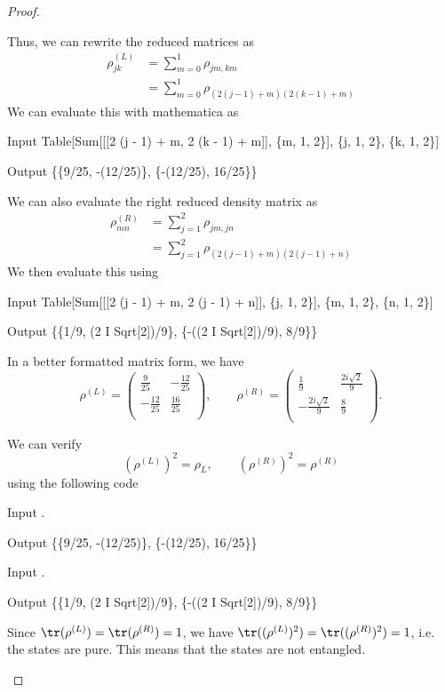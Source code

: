 \begin{proof}
\begin{parts}
		Thus, we can rewrite the reduced matrices as
		\begin{align*}
			\rho_{jk}^{(L)} &= \sum_{m=0}^1 \rho_{jm,km}\\
			&= \sum_{m=0}^1 \rho_{(2(j-1)+m)(2(k-1)+m)}
		\end{align*}
		We can evaluate this with mathematica as
		\begin{mmaCell}{Input}
Table[Sum[\mmaUnd{\(\rho\)}[[2 (j - 1) + m, 2 (k - 1) + m]], \{m, 1, 2\}], \{j, 1, 2\}, \{k, 1, 2\}]
		\end{mmaCell}
		\begin{mmaCell}{Output}
\{\{9/25, -(12/25)\}, \{-(12/25), 16/25\}\}
		\end{mmaCell}
		We can also evaluate the right reduced density matrix as
		\begin{align*}
			\rho_{mn}^{(R)} &= \sum_{j=1}^2 \rho_{jm,jn} \\
					&= \sum_{j=1}^2 \rho_{(2(j-1)+m)(2(j-1)+n)} 
		\end{align*}
		We then evaluate this using
		\begin{mmaCell}{Input}
Table[Sum[\mmaUnd{\(\rho\)}[[2 (j - 1) + m, 2 (j - 1) + n]], \{j, 1, 2\}], \{m, 1, 2\}, \{n, 1, 2\}]
		\end{mmaCell}
		\begin{mmaCell}{Output}
\{\{1/9, (2 I Sqrt[2])/9\}, \{-((2 I Sqrt[2])/9), 8/9\}\}
		\end{mmaCell}
		In a better formatted matrix form, we have
		\[
			\rho^{(L)} =\left(
\begin{array}{cc}
 \frac{9}{25} & -\frac{12}{25} \\
 -\frac{12}{25} & \frac{16}{25} \\
\end{array}
\right), \qquad \rho^{(R)} =\left(
\begin{array}{cc}
 \frac{1}{9} & \frac{2 i \sqrt{2}}{9} \\
 -\frac{2 i \sqrt{2}}{9} & \frac{8}{9} \\
\end{array}
\right)  
		.\] 
	\item We can verify
		\[
			(\rho^{(L)})^2 = \rho_L,\qquad (\rho^{(R)})^2 = \rho^{(R)}
		\]
		using the following code
		\begin{mmaCell}{Input}
.
		\end{mmaCell}
		\begin{mmaCell}{Output}
\{\{9/25, -(12/25)\}, \{-(12/25), 16/25\}\}
		\end{mmaCell}
		\begin{mmaCell}{Input}
.
		\end{mmaCell}
		\begin{mmaCell}{Output}
\{\{1/9, (2 I Sqrt[2])/9\}, \{-((2 I Sqrt[2])/9), 8/9\}\}
		\end{mmaCell}
		Since $\tr(\rho^{(L)})=\tr(\rho^{(R)})=1$, we have $\tr((\rho^{(L)})^2)=\tr((\rho^{(R)})^2)=1$, i.e. the states are pure. This means that the states are not entangled.\qedhere
	\end{parts}
\end{proof}
